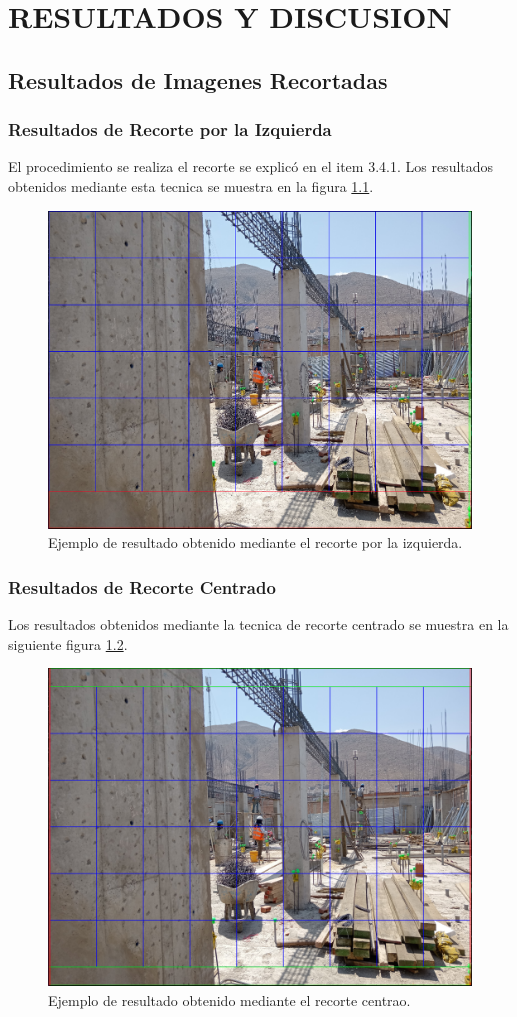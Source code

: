 \chapter{RESULTADOS Y DISCUSION}

\section{Resultados de Imagenes Recortadas}

\subsection{Resultados de Recorte por la Izquierda}

El procedimiento se realiza el recorte se explicó en el item 3.4.1. Los resultados obtenidos mediante esta tecnica se muestra en la figura \ref{fig:left_use}.

\begin{figure}[!ht]
  \centering
  \includegraphics[width=.49\linewidth]{images/left_use.png}
  \caption{Ejemplo de resultado obtenido mediante el recorte por la izquierda.}
  \label{fig:left_use}
\end{figure}

\subsection{Resultados de Recorte Centrado}

Los resultados obtenidos mediante la tecnica de recorte centrado se muestra en la siguiente figura \ref{fig:center_use}.

\begin{figure}[!ht]
  \centering
  \includegraphics[width=.49\linewidth]{images/center_use.png}
  \caption{Ejemplo de resultado obtenido mediante el recorte centrao.}
  \label{fig:center_use}
\end{figure}

